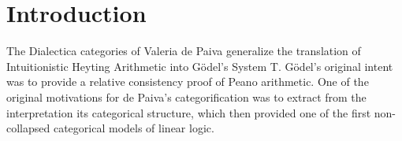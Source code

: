\documentclass[reqno]{amsart}
\theoremstyle{plain}
\theoremstyle{definition}
\DeclareMathOperator{\D}{D}
\begin{document}
\maketitle


\section{Introduction}
 



The Dialectica categories of Valeria de Paiva \cite{dePaiva1991} generalize the translation of Intuitionistic Heyting Arithmetic into G\"odel's System T. G\"odel's original intent~\cite{godel1990} was to provide a relative consistency proof of Peano arithmetic. One of the original motivations for de Paiva's categorification  was to extract from the interpretation its categorical structure, which then provided one of the first non-collapsed categorical models of linear logic.
\end{document}
